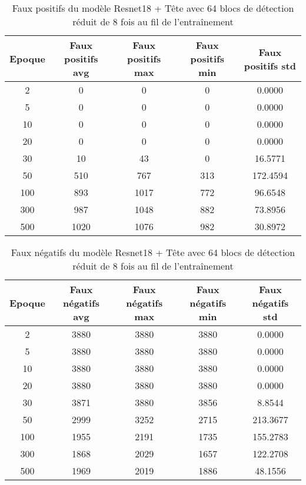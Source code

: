\begin{table}[!ht]
    \caption{Faux positifs du modèle Resnet18 + Tête avec 64 blocs de détection réduit de 8 fois au fil de l'entraînement}
    \label{tab:resnet18+head_64n_false_positive_reduced_8x_precision}
    \centering
    \begin{tabular}{ |c||c|c|c|c|  }
        \hline
        \rowcolor{gray!50}
        Epoque & Faux positifs avg & Faux positifs max & Faux positifs min & Faux positifs std\\
        \hline
        2 & 0 & 0 & 0 & 0.0000\\
        5 & 0 & 0 & 0 & 0.0000\\
        10 & 0 & 0 & 0 & 0.0000\\
        20 & 0 & 0 & 0 & 0.0000\\
        30 & 10 & 43 & 0 & 16.5771\\
        50 & 510 & 767 & 313 & 172.4594\\
        100 & 893 & 1017 & 772 & 96.6548\\
        300 & 987 & 1048 & 882 & 73.8956\\
        500 & 1020 & 1076 & 982 & 30.8972\\
        \hline
    \end{tabular}
\end{table}

\begin{table}[!ht]
    \caption{Faux négatifs du modèle Resnet18 + Tête avec 64 blocs de détection réduit de 8 fois au fil de l'entraînement}
    \label{tab:resnet18+head_64n_false_negative_reduced_8x_precision}
    \centering
    \begin{tabular}{ |c||c|c|c|c|  }
        \hline
        \rowcolor{gray!50}
        Epoque & Faux négatifs avg & Faux négatifs max & Faux négatifs min & Faux négatifs std\\
        \hline
        2 & 3880 & 3880 & 3880 & 0.0000\\
        5 & 3880 & 3880 & 3880 & 0.0000\\
        10 & 3880 & 3880 & 3880 & 0.0000\\
        20 & 3880 & 3880 & 3880 & 0.0000\\
        30 & 3871 & 3880 & 3856 & 8.8544\\
        50 & 2999 & 3252 & 2715 & 213.3677\\
        100 & 1955 & 2191 & 1735 & 155.2783\\
        300 & 1868 & 2029 & 1657 & 122.2708\\
        500 & 1969 & 2019 & 1886 & 48.1556\\
        \hline
    \end{tabular}
\end{table}

